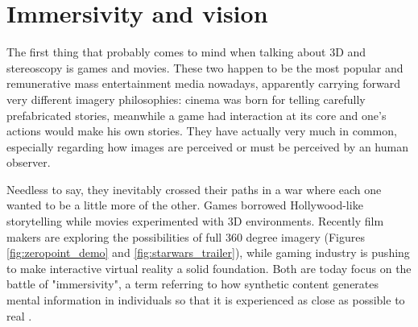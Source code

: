 \section{Immersivity and vision}
The first thing that probably comes to mind when talking about 3D and stereoscopy is games and movies. These two happen to be the most popular and remunerative mass entertainment media nowadays, apparently carrying forward very different imagery philosophies: cinema was born for telling carefully prefabricated stories, meanwhile a game had interaction at its core and one’s actions would make his own stories. They have actually very much in common, especially regarding how images are perceived or must be perceived by an human observer. 

Needless to say, they inevitably crossed their paths in a war where each one wanted to be a little more of the other. Games borrowed Hollywood-like storytelling while movies experimented with 3D environments. Recently film makers are exploring the possibilities of full 360 degree imagery (Figures \ref{fig:zeropoint_demo} and \ref{fig:starwars_trailer}), while gaming industry is pushing to make interactive virtual reality a solid foundation. Both are today focus on the battle of "immersivity", a term referring to how synthetic content generates mental information in individuals so that it is experienced as close as possible to real \cite{immersivity_vr}.

